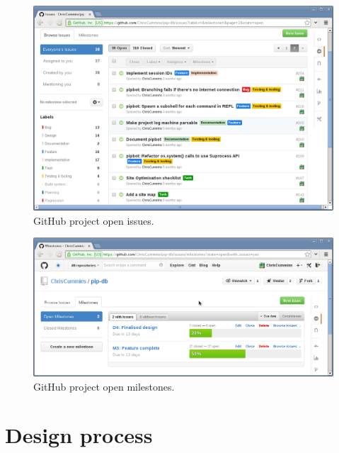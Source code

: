 \begin{figure}[H]
\centering
    \includegraphics[width=\textwidth]{assets/github-issues}
\caption[GitHub project open issues]
        {GitHub project open issues.}
\label{fig:github-issues}
\end{figure}




\begin{figure}[H]
\centering
    \includegraphics[width=\textwidth]{assets/github-milestones}
\caption[GitHub project open milestones]
        {GitHub project open milestones.}
\label{fig:github-milestones}
\end{figure}


\section{Design process}\label{sec:design-process}


